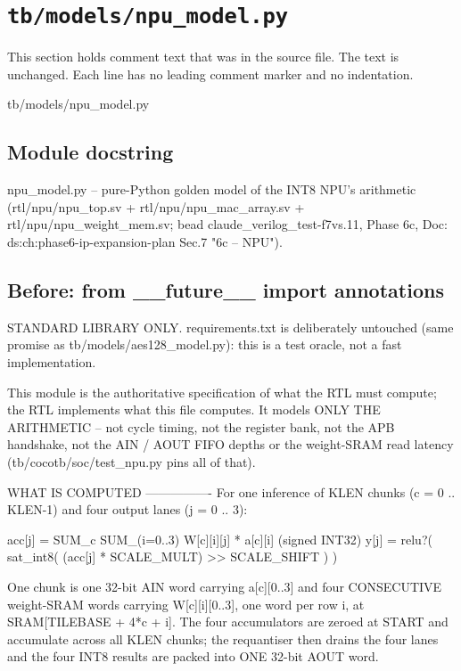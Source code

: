 \section{\texttt{tb/models/npu\_model.py}}\label{tm:suite:npu-model}

This section holds comment text that was in the source file. The text is unchanged. Each line has no leading comment marker and no indentation.

\begin{relocated}{tb/models/npu_model.py}

\subsection*{Module docstring}

\begin{textblock}
npu_model.py -- pure-Python golden model of the INT8 NPU's arithmetic (rtl/npu/npu_top.sv +
rtl/npu/npu_mac_array.sv + rtl/npu/npu_weight_mem.sv; bead claude_verilog_test-f7vs.11, Phase 6c,
Doc: ds:ch:phase6-ip-expansion-plan Sec.7 "6c -- NPU").
\end{textblock}

\subsection*{Before: from \_\_future\_\_ import annotations}

\begin{textblock}
STANDARD LIBRARY ONLY. requirements.txt is deliberately untouched (same promise as
tb/models/aes128_model.py): this is a test oracle, not a fast implementation.

This module is the authoritative specification of what the RTL must compute; the RTL implements
what this file computes. It models ONLY THE ARITHMETIC -- not cycle timing, not the register bank,
not the APB handshake, not the AIN / AOUT FIFO depths or the weight-SRAM read latency
(tb/cocotb/soc/test_npu.py pins all of that).

WHAT IS COMPUTED
----------------
For one inference of KLEN chunks (c = 0 .. KLEN-1) and four output lanes (j = 0 .. 3):

acc[j] = SUM_c SUM_(i=0..3)  W[c][i][j] * a[c][i]                  (signed INT32)
y[j]   = relu?( sat_int8( (acc[j] * SCALE_MULT) >> SCALE_SHIFT ) )

One chunk is one 32-bit AIN word carrying a[c][0..3] and four CONSECUTIVE weight-SRAM words
carrying W[c][i][0..3], one word per row i, at SRAM[TILEBASE + 4*c + i]. The four accumulators are
zeroed at START and accumulate across all KLEN chunks; the requantiser then drains the four lanes
and the four INT8 results are packed into ONE 32-bit AOUT word.


\end{textblock}
\end{relocated}
